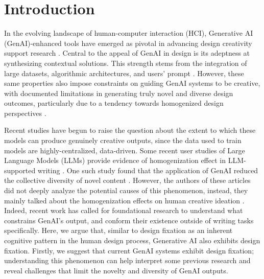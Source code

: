 
\section{Introduction}

In the evolving landscape of human-computer interaction (HCI), Generative AI (GenAI)-enhanced tools have emerged as pivotal in advancing design creativity support research \cite{oh2024lumimood, choi2024creativeconnect, lin2024jigsaw}. Central to the appeal of GenAI in design is its adeptness at synthesizing contextual solutions. This strength stems from the integration of large datasets, algorithmic architectures, and users' prompt \cite{schellaert2023your}. However, these same properties also impose constraints on guiding GenAI systems to be creative, with documented limitations in generating truly novel and diverse design outcomes, particularly due to a tendency towards homogenized design perspectives \cite{doshi2024generative, kobiella2024if}.

Recent studies have begun to raise the question about the extent to which these models can produce genuinely creative outputs, since the data used to train models are highly-centralized, data-driven. Some recent user studies of Large Language Models (LLMs) provide evidence of homogenization effect in LLM-supported writing \cite{padmakumar2023does, doshi2023generative}. One such study found that the application of GenAI reduced the collective diversity of novel content \cite{doshi2024generative}. However, the authors of these articles did not deeply analyze the potential causes of this phenomenon, instead, they mainly talked about the homogenization effects on human creative ideation \cite{anderson2024homogenization, doshi2024generative}. Indeed, recent work has called for foundational research to understand what constrains GenAI’s output, and conform their existence outside of writing tasks specifically. Here, we argue that, similar to design fixation as an inherent cognitive pattern in the human design process, Generative AI also exhibits design fixation. Firstly, we suggest that current GenAI systems exhibit design fixation; understanding this phenomenon can help interpret some previous research and reveal challenges that limit the novelty and diversity of GenAI outputs. 

